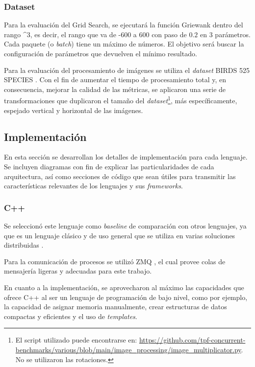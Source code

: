 \documentclass[11pt]{article}
\let\Oldsubsection\subsection
\renewcommand{\subsection}{\FloatBarrier\Oldsubsection}
\let\Oldsubsubsection\subsubsection
\renewcommand{\subsubsection}{\FloatBarrier\Oldsubsubsection}
\newcommand{\english}[1]{\textit{#1}}
\begin{document}
\subsubsection{Dataset}

Para la evaluación del Grid Search, se ejecutará la función Griewank \cite{sis_dist:griewank} dentro del rango \break
[-600; 600; $0.2$]\^{}3, es decir, el rango que va de -600 a 600 con paso de $0.2$ en 3 parámetros. Cada paquete (o \english{batch}) tiene un máximo de  números. El objetivo será buscar la configuración de parámetros que devuelven el mínimo resultado.

Para la evaluación del procesamiento de imágenes se utiliza el \english{dataset} BIRDS 525 SPECIES \cite{sis_dist:birds_dataset}. Con el fin de aumentar el tiempo de procesamiento total y, en consecuencia, mejorar la calidad de las métricas, se aplicaron una serie de transformaciones que duplicaron el tamaño del \english{dataset}\footnote{El script utilizado puede encontrarse en: \url{https://github.com/tpf-concurrent-benchmarks/various/blob/main/image_processing/image_multiplicator.py}. No se utilizaron las rotaciones.}, más específicamente, espejado vertical y horizontal de las imágenes.

\newpage

\subsection{Implementación}

En esta sección se desarrollan los detalles de implementación para cada lenguaje. Se incluyen diagramas con fin de explicar las particularidades de cada arquitectura, así como secciones de código que sean útiles para transmitir las características relevantes de los lenguajes y sus \english{frameworks}.

\subsubsection{C++}

Se seleccionó este lenguaje como \english{baseline} de comparación con otros lenguajes, ya que es un lenguaje clásico y de uso general que se utiliza en varias soluciones distribuidas \cite{cpp:ex:ray-io} \cite{cpp:ex:red-panda}.

Para la comunicación de procesos se utilizó ZMQ \cite{cpp:lib:zmq}, el cual provee colas de mensajería ligeras y adecuadas para este trabajo.

En cuanto a la implementación, se aprovecharon al máximo las capacidades que ofrece C++ al ser un lenguaje de programación de bajo nivel, como por ejemplo, la capacidad de asignar memoria manualmente, crear estructuras de datos compactas y eficientes y el uso de \english{templates}.
\end{document}
